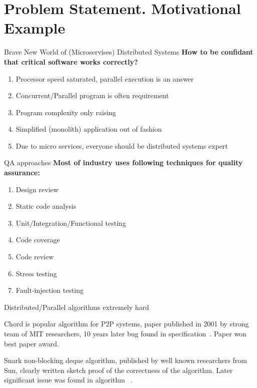 \documentclass[12pt]{beamer}
\begin{document}
  \section{Problem Statement. Motivational Example}
  \begin{frame}{Brave New World of (Microservises) Distributed Systems}
      \textbf{How to be confidant that critical software works correctly?}
      \begin{enumerate}
          \item Processor speed saturated, parallel execution is an answer
          \item Concurrent/Parallel program is often requirement
          \item Program complexity only raising
          \item Simplified (monolith) application out of fashion
          \item Due to micro services, everyone should be distributed
              systems expert
      \end{enumerate}
  \end{frame}
  \begin{frame}{QA approaches}
      \textbf{Most of industry uses following techniques for quality
      assurance:}
      \begin{enumerate}
          \item Design review
          \item Static code analysis
          \item Unit/Integration/Functional testing
          \item Code coverage
          \item Code review
          \item Stress testing
          \item Fault-injection testing
      \end{enumerate}
  \end{frame}
  \begin{frame}{Distributed/Parallel algorithms extremely hard}
      \begin{alertblock}{Chord}
          is popular algorithm for P2P systems, paper published in
          2001 by strong team of MIT researchers, 10 years later bug found
          in specification~\cite{stoica2001chord, Zave15}. Paper won best
          paper award.
      \end{alertblock}
      \begin{alertblock}{Snark}
          non-blocking deque algorithm, published by well known
          researchers from Sun, clearly written sketch proof of the correctness
          of the algorithm. Later significant issue was found in algorithm
          ~\cite{doherty2004dcas, lamport2006checking}.
      \end{alertblock}
  \end{frame}
\end{document}
